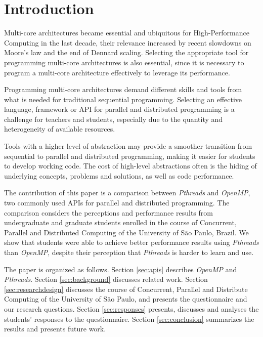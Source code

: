 \section{Introduction}
\label{sec:introduction}

Multi-core architectures became essential and ubiquitous for High-Performance
Computing in the last decade, their relevance increased by recent slowdowns on
Moore's law and the end of Dennard scaling.  Selecting the appropriate tool for
programming multi-core architectures is also essential, since it is necessary
to program a multi-core architecture effectively to leverage its performance.

Programming multi-core architectures demand different skills and tools from
what is needed for traditional sequential programming. Selecting an effective
language, framework or API for parallel and distributed programming is a
challenge for teachers and students, especially due to the quantity and
heterogeneity of available resources.

Tools with a higher level of abstraction may provide a smoother transition from
sequential to parallel and distributed programming, making it easier for
students to develop working code. The cost of high-level abstractions often is
the hiding of underlying concepts, problems and solutions, as well as code
performance.

The contribution of this paper is a comparison between \textit{Pthreads} and
\textit{OpenMP}, two commonly used APIs for parallel and distributed
programming.  The comparison considers the perceptions and performance results
from undergraduate and graduate students enrolled in the course of Concurrent,
Parallel and Distributed Computing of the University of São Paulo, Brazil.  We
show that students were able to achieve better performance results using
\textit{Pthreads} than \textit{OpenMP}, despite their perception that
\textit{Pthreads} is harder to learn and use.

The paper is organized as follows.
Section \ref{sec:apis} describes \textit{OpenMP} and \textit{Pthreads}.
Section \ref{sec:background} discusses related work.
Section \ref{sec:researchdesign} discusses the course of
Concurrent, Parallel and Distribute Computing of the University
of São Paulo, and presents the questionnaire and our research
questions.
Section \ref{sec:responses} presents, discusses and analyses
the students' responses to the questionnaire.
Section \ref{sec:conclusion} summarizes the results and
presents future work.

